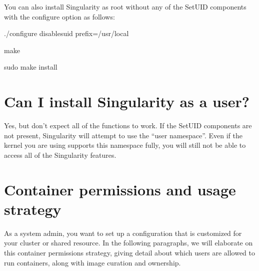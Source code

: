 \documentclass[letterpaper,10pt,english]{sphinxmanual}
\begin{document}
%
\begin{sphinxVerbatim}[commandchars=\\\{\}]








   
\end{sphinxVerbatim}

You can also install Singularity as root without any of the SetUID
components with the configure option  as follows:

%
\begin{sphinxVerbatim}[commandchars=\\\{\}]
\PYGZdl{} ./configure \PYGZhy{}\PYGZhy{}disable\PYGZhy{}suid \PYGZhy{}\PYGZhy{}prefix=/usr/local

\PYGZdl{} make

\PYGZdl{} sudo make install
\end{sphinxVerbatim}


\section{Can I install Singularity as a user?}
\label{\detokenize{security:can-i-install-singularity-as-a-user}}
Yes, but don’t expect all of the functions to work. If the SetUID
components are not present, Singularity will attempt to use the “user
namespace”. Even if the kernel you are using supports this namespace
fully, you will still not be able to access all of the Singularity
features.


\section{Container permissions and usage strategy}
\label{\detokenize{security:container-permissions-and-usage-strategy}}
As a system admin, you want to set up a configuration that is
customized for your cluster or shared resource. In the following
paragraphs, we will elaborate on this container permissions strategy,
giving detail about which users are allowed to run containers, along
with image curation and ownership.
\end{document}
